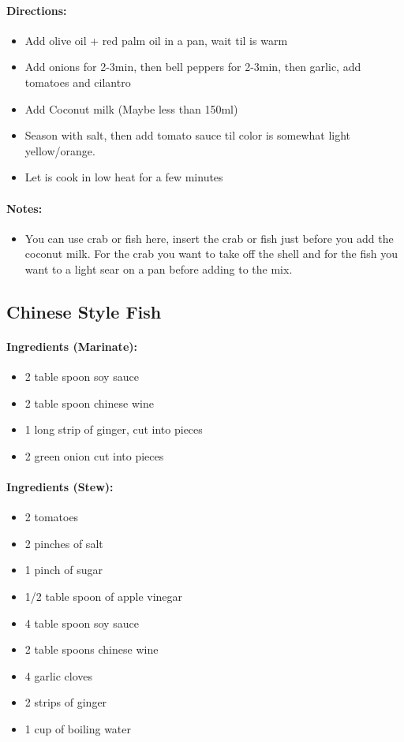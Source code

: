 \documentclass{article}
\begin{document}
\paragraph{Directions:}
\begin{itemize}
    \item Add olive oil + red palm oil in a pan, wait til is warm
    \item Add onions for 2-3min, then bell peppers for 2-3min, then garlic, add tomatoes and cilantro
    \item Add Coconut milk (Maybe less than 150ml)
    \item Season with salt, then add tomato sauce til color is somewhat light yellow/orange.
    \item Let is cook in low heat for a few minutes
\end{itemize}

\paragraph{Notes:}
\begin{itemize}
    \item You can use crab or fish here, insert the crab or fish just before you add the coconut milk. For the crab you want to take off the shell and for the fish you want to a light sear on a pan before adding to the mix.
\end{itemize}

\subsection{Chinese Style Fish} 

\paragraph{Ingredients (Marinate):}
\begin{itemize}
    \item 2 table spoon soy sauce
    \item 2 table spoon chinese wine
    \item 1 long strip of ginger, cut into pieces
    \item 2 green onion cut into pieces
\end{itemize}  

\paragraph{Ingredients (Stew):}
\begin{itemize}
    \item 2 tomatoes
    \item 2 pinches of salt
    \item 1 pinch of sugar
    \item 1/2 table spoon of apple vinegar
    \item 4 table spoon soy sauce
    \item 2 table spoons chinese wine
    \item 4 garlic cloves
    \item 2 strips of ginger
    \item 1 cup of boiling water
\end{itemize}  
\end{document}
